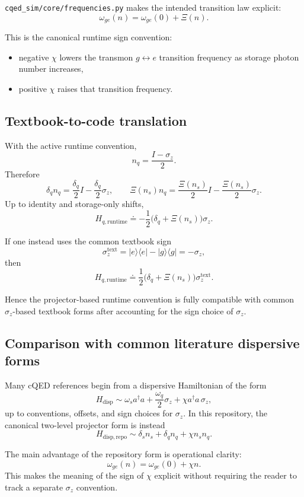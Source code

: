 \documentclass[11pt]{article}
\begin{document}
\noindent
\texttt{cqed\_sim/core/frequencies.py} makes the intended transition law explicit:
\[
\omega_{ge}(n)=\omega_{ge}(0)+\Xi(n).
\]

\noindent
This is the canonical runtime sign convention:
\begin{itemize}[leftmargin=1.5em]
  \item negative \(\chi\) lowers the transmon \(g\leftrightarrow e\) transition
  frequency as storage photon number increases,
  \item positive \(\chi\) raises that transition frequency.
\end{itemize}

\subsection*{Textbook-to-code translation}
With the active runtime convention,
\[
n_q = \frac{I-\sigma_z}{2}.
\]
Therefore
\[
\delta_q n_q
=
\frac{\delta_q}{2} I
-
\frac{\delta_q}{2} \sigma_z,
\qquad
\Xi(n_s)n_q
=
\frac{\Xi(n_s)}{2} I
-
\frac{\Xi(n_s)}{2} \sigma_z.
\]
Up to identity and storage-only shifts,
\[
H_{q,\mathrm{runtime}} \doteq -\frac{1}{2}\bigl(\delta_q+\Xi(n_s)\bigr)\sigma_z.
\]

\noindent
If one instead uses the common textbook sign
\[
\sigma_z^{\mathrm{text}}=|e\rangle\langle e|-|g\rangle\langle g|=-\sigma_z,
\]
then
\[
H_{q,\mathrm{runtime}} \doteq
\frac{1}{2}\bigl(\delta_q+\Xi(n_s)\bigr)\sigma_z^{\mathrm{text}}.
\]

\noindent
Hence the projector-based runtime convention is fully compatible with common
\(\sigma_z\)-based textbook forms after accounting for the sign choice of \(\sigma_z\).

\subsection*{Comparison with common literature dispersive forms}
Many cQED references begin from a dispersive Hamiltonian of the form
\[
H_{\mathrm{disp}} \sim \omega_s a^\dagger a + \frac{\omega_q}{2}\sigma_z + \chi a^\dagger a\,\sigma_z,
\]
up to conventions, offsets, and sign choices for \(\sigma_z\). In this repository,
the canonical two-level projector form is instead
\[
H_{\mathrm{disp,repo}} \sim \delta_s n_s + \delta_q n_q + \chi n_s n_q.
\]

\noindent
The main advantage of the repository form is operational clarity:
\[
\omega_{ge}(n)=\omega_{ge}(0)+\chi n.
\]
This makes the meaning of the sign of \(\chi\) explicit without requiring the
reader to track a separate \(\sigma_z\) convention.
\end{document}
